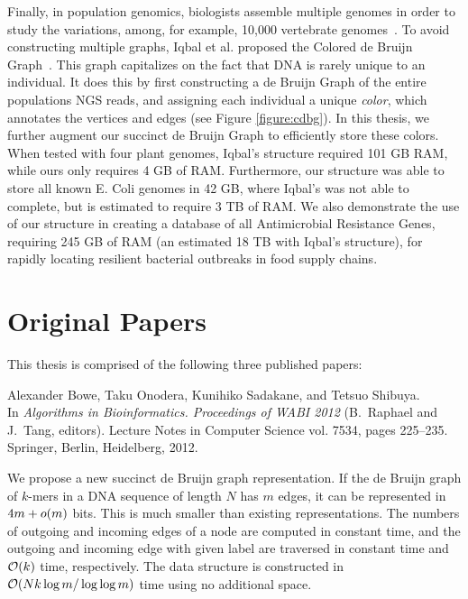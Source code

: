Finally, in population genomics, biologists assemble multiple genomes in order to study the variations, among, for example, 10,000 vertebrate genomes~\citep{Haussler:2009}. To avoid constructing multiple graphs, Iqbal et al. proposed the Colored de Bruijn Graph~\cite{ICTFM12}. This graph capitalizes on the fact that DNA is rarely unique to an individual. It does this by first constructing a de Bruijn Graph of the entire populations NGS reads, and assigning each individual a unique \emph{color}, which annotates the vertices and edges (see Figure \ref{figure:cdbg}). In this thesis, we further augment our succinct de Bruijn Graph to efficiently store these colors. When tested with four plant genomes, Iqbal’s structure required 101 GB RAM, while ours only requires 4 GB of RAM. Furthermore, our structure was able to store all known E. Coli genomes in 42 GB, where Iqbal’s was not able to complete, but is estimated to require 3 TB of RAM. We also demonstrate the use of our structure in creating a database of all Antimicrobial Resistance Genes, requiring 245 GB of RAM (an estimated 18 TB with Iqbal’s structure), for rapidly locating resilient bacterial outbreaks in food supply chains.



\section{Original Papers}

This thesis is comprised of the following three published papers:


{Alexander Bowe, Taku Onodera, Kunihiko Sadakane, and Tetsuo Shibuya.\\
In \textit{Algorithms in Bioinformatics. Proceedings of WABI 2012} (B.~Raphael and J.~Tang, editors). 
Lecture Notes in Computer Science vol. 7534, pages 225--235. 
Springer, Berlin, Heidelberg, 2012.}

\noindent
We propose a new succinct de Bruijn graph representation.  
If the de Bruijn graph of $k$-mers in a DNA sequence of length $N$ has $m$ edges,
it can be represented in $4m + o(m)$ bits.
This is much smaller than existing representations.
The numbers of outgoing and incoming edges of a node are computed in constant time, and
the outgoing and incoming edge with given label are traversed in constant time
and $\mathcal{O}(k)$ time, respectively.
The data structure is constructed in $\mathcal{O}(Nk \log m/\log\log m)$
time using no additional space.

